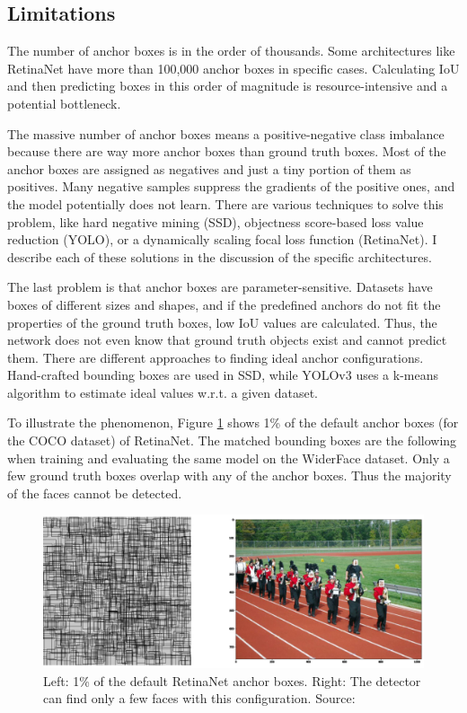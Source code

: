 \subsection{Limitations}

The number of anchor boxes is in the order of thousands. Some architectures like RetinaNet\cite{RetinaNet} have more than 100,000 anchor boxes in specific cases. Calculating IoU and then predicting boxes in this order of magnitude is resource-intensive and a potential bottleneck.

The massive number of anchor boxes means a positive-negative class imbalance because there are way more anchor boxes than ground truth boxes. Most of the anchor boxes are assigned as negatives and just a tiny portion of them as positives. Many negative samples suppress the gradients of the positive ones, and the model potentially does not learn. There are various techniques to solve this problem, like hard negative mining\cite{SSD} (SSD), objectness score-based loss value reduction\cite{YOLO} (YOLO), or a dynamically scaling focal loss function\cite{RetinaNet} (RetinaNet). I describe each of these solutions in the discussion of the specific architectures.

The last problem is that anchor boxes are parameter-sensitive. Datasets have boxes of different sizes and shapes, and if the predefined anchors do not fit the properties of the ground truth boxes, low IoU values are calculated. Thus, the network does not even know that ground truth objects exist and cannot predict them. There are different approaches to finding ideal anchor configurations. Hand-crafted bounding boxes are used in SSD, while YOLOv3\cite{YOLOv3} uses a k-means algorithm to estimate ideal values w.r.t. a given dataset.

To illustrate the phenomenon, Figure \ref{fig:anchor_bad_match} shows 1\% of the default anchor boxes (for the COCO dataset) of RetinaNet. The matched bounding boxes are the following when training and evaluating the same model on the WiderFace\cite{WiderFace} dataset. Only a few ground truth boxes overlap with any of the anchor boxes. Thus the majority of the faces cannot be detected.

\begin{figure}[htb]
 \centerline{\includegraphics[width=1.0\columnwidth]{.//Figure/Detector/anchor_bad_match.png}}
 \caption{Left: 1\% of the default RetinaNet anchor boxes. Right: The detector can find only a few faces with this configuration. Source: \cite{AnchorBoxes}}
 \label{fig:anchor_bad_match}
\end{figure}

